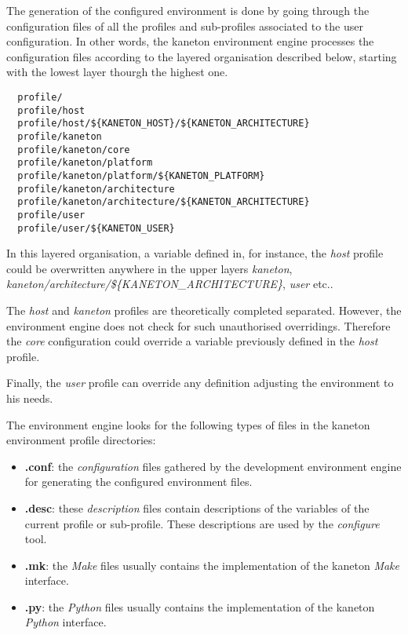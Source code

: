 The generation of the configured environment is done by going through
the configuration files of all the profiles and sub-profiles associated
to the user configuration. In other words, the kaneton environment engine
processes the configuration files according to the layered organisation
described below, starting with the lowest layer thourgh the highest one.

\begin{verbatim}
  profile/
  profile/host
  profile/host/${KANETON_HOST}/${KANETON_ARCHITECTURE}
  profile/kaneton
  profile/kaneton/core
  profile/kaneton/platform
  profile/kaneton/platform/${KANETON_PLATFORM}
  profile/kaneton/architecture
  profile/kaneton/architecture/${KANETON_ARCHITECTURE}
  profile/user
  profile/user/${KANETON_USER}         
\end{verbatim}

In this layered organisation, a variable defined in, for instance, the
\textit{host} profile could be overwritten anywhere in the upper layers
\textit{kaneton}, \textit{kaneton/architecture/\$\{KANETON\_ARCHITECTURE\}},
\textit{user} etc..

The \textit{host} and \textit{kaneton} profiles are theoretically completed
separated. However, the environment engine does not check for such
unauthorised overridings. Therefore the \textit{core} configuration could
override a variable previously defined in the \textit{host} profile.

Finally, the \textit{user} profile can override any definition adjusting the
environment to his needs.

The environment engine looks for the following types of files in the
kaneton environment profile directories:

\begin{itemize}
  \item
    \textbf{.conf}: the \textit{configuration} files gathered by the
    development environment engine for generating the configured environment
    files.
  \item
    \textbf{.desc}: these \textit{description} files contain descriptions of
    the variables of the current profile or sub-profile. These descriptions
    are used by the \textit{configure} tool.
  \item
    \textbf{.mk}: the \textit{Make} files usually contains the implementation
    of the kaneton \textit{Make} interface.
  \item
    \textbf{.py}: the \textit{Python} files usually contains the
    implementation of the kaneton \textit{Python} interface.
\end{itemize}

